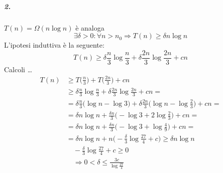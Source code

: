 \subparagraph{2.} $T(n) = \Omega (n \log n)$ è analoga %
$$\exists \delta > 0 : \forall n > n_0 \Rightarrow T(n) \geq \delta n \log n $$
L'ipotesi induttiva è la seguente:
\[ 
	T(n) \geq \delta \frac{n}{3} \log \frac{n}{3} + \delta \frac{2n}{3} \log \frac{2n}{3} + cn
\]
Calcoli \dots
\begin{align*}
	T(n) & \geq T\Big(\frac{n}{3} \Big) + T\Big(\frac{2n}{3} \Big) + cn \\
	& \geq \delta \frac{n}{3} \log \frac{n}{3} + \delta \frac{2n}{3} \log \frac{2n}{3} + cn = \\
	& = \delta \frac{n}{3} \Big(\log n - \log 3 \Big) + \delta \frac{2n}{3} \Big(\log n - \log \frac{2}{3} \Big) + cn = \\
	& = \delta n \log n + \frac{\delta n}{3} \Big( - \log 3 + 2 \log \frac{2}{3} \Big) + cn = \\
	& = \delta n \log n + \frac{\delta n}{3} \Big( - \log 3 + \log \frac{4}{9} \Big) + cn = \\
	& = \delta n \log n + n \Big( - \frac{\delta}{3} \log \frac{27}{4} + c \Big) \geq \delta n \log n\\
	& \quad - \frac{\delta}{3} \log \frac{27}{4} + c \geq 0 \\
	& \quad \Rightarrow 0 < \delta \leq \frac{3c}{\log \frac{27}{4}}
\end{align*}